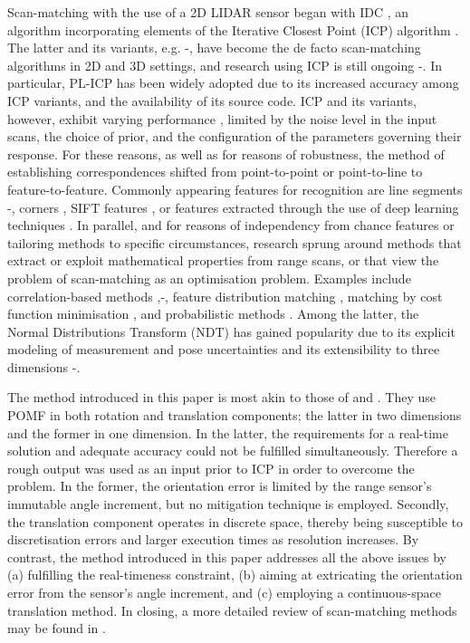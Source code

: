 Scan-matching with the use of a 2D LIDAR sensor began with IDC \cite{LuMilios},
an algorithm incorporating elements of the Iterative Closest Point (ICP)
algorithm \cite{ICP}. The latter and its variants, e.g.
\cite{weighted}-\cite{plicp}, have become the de facto scan-matching algorithms
in 2D and 3D settings, and research using ICP is still ongoing
\cite{ICP_var_1}-\cite{Marchel}. In particular, PL-ICP \cite{plicp} has been
widely adopted due to its increased accuracy among ICP variants, and the
availability of its source code. ICP and its variants, however, exhibit varying
performance \cite{icp_comp_trade}, limited by the noise level in the input
scans, the choice of prior, and the configuration of the parameters
governing their response. For these reasons, as well as for reasons of
robustness, the method of establishing correspondences shifted from
point-to-point or point-to-line to feature-to-feature. Commonly appearing
features for recognition are line segments \cite{CLS}-\cite{Wen}, corners
\cite{wang}, SIFT features \cite{Jiayuan}, or features extracted through the
use of deep learning techniques \cite{Jiaxin}\cite{li}. In parallel, and for
reasons of independency from chance features or tailoring methods to specific
circumstances, research sprung around methods that extract or exploit
mathematical properties from range scans, or that view the problem of
scan-matching as an optimisation problem. Examples include correlation-based
methods \cite{olson},\cite{olson_2015}-\cite{Konecny}, feature distribution
matching \cite{HSM}, matching by cost function minimisation \cite{PB_PSM}, and
probabilistic methods \cite{pIC}\cite{gpm}. Among the latter, the Normal
Distributions Transform (NDT) \cite{ndt1} has gained popularity due to its
explicit modeling of measurement and pose uncertainties and its extensibility
to three dimensions \cite{ndt2}-\cite{ndt7}.

The method introduced in this paper is most akin to those of \cite{Heng} and
\cite{Jiang}. They use POMF \cite{fmt2d} in both rotation and translation
components; the latter in two dimensions and the former in one dimension. In
the latter, the requirements for a real-time solution and adequate accuracy
could not be fulfilled simultaneously. Therefore a rough output was used as an
input prior to ICP in order to overcome the problem. In the former, the
orientation error is limited by the range sensor's immutable angle increment,
but no mitigation technique is employed. Secondly, the translation component
operates in discrete space, thereby being susceptible to discretisation errors
and larger execution times as resolution increases. By contrast, the method
introduced in this paper addresses all the above issues by (a) fulfilling the
real-timeness constraint, (b) aiming at extricating the orientation error from
the sensor's angle increment, and (c) employing a continuous-space translation
method. In closing, a more detailed review of scan-matching methods may be
found in \cite{pose_selection}.
